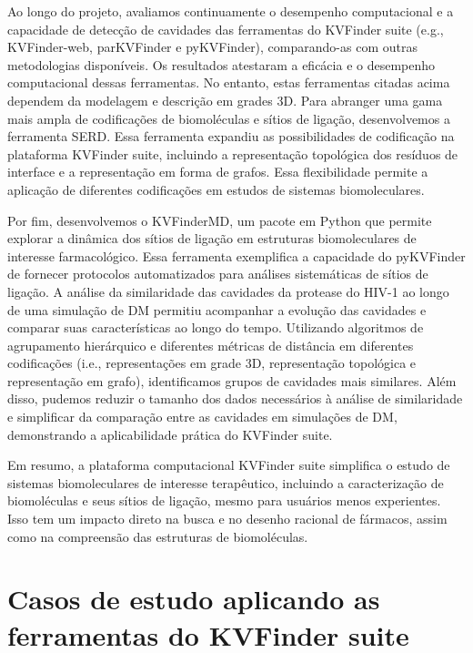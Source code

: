 \documentclass[Portugues]{phdquali}
\def\ie{i.e.\onedot}
\def\eg{e.g.\onedot}
\begin{document}
Ao longo do projeto, avaliamos continuamente o desempenho computacional e a capacidade de detecção de cavidades das ferramentas do KVFinder suite (\eg, KVFinder-web, parKVFinder e pyKVFinder), comparando-as com outras metodologias disponíveis. Os resultados atestaram a eficácia e o desempenho computacional dessas ferramentas. No entanto, estas ferramentas citadas acima dependem da modelagem e descrição em grades 3D. Para abranger uma gama mais ampla de codificações de biomoléculas e sítios de ligação, desenvolvemos a ferramenta SERD. Essa ferramenta expandiu as possibilidades de codificação na plataforma KVFinder suite, incluindo a representação topológica dos resíduos de interface e a representação em forma de grafos. Essa flexibilidade permite a aplicação de diferentes codificações em estudos de sistemas biomoleculares.

Por fim, desenvolvemos o KVFinderMD, um pacote em Python que permite explorar a dinâmica dos sítios de ligação em estruturas biomoleculares de interesse farmacológico. Essa ferramenta exemplifica a capacidade do pyKVFinder de fornecer protocolos automatizados para análises sistemáticas de sítios de ligação. A análise da similaridade das cavidades da protease do HIV-1 ao longo de uma simulação de DM permitiu acompanhar a evolução das cavidades e comparar suas características ao longo do tempo. Utilizando algoritmos de agrupamento hierárquico e diferentes métricas de distância em diferentes codificações (\ie, representações em grade 3D, representação topológica e representação em grafo), identificamos grupos de cavidades mais similares. Além disso, pudemos reduzir o tamanho dos dados necessários à análise de similaridade e simplificar da comparação entre as cavidades em simulações de DM, demonstrando a aplicabilidade prática do KVFinder suite.

Em resumo, a plataforma computacional KVFinder suite simplifica o estudo de sistemas biomoleculares de interesse terapêutico, incluindo a caracterização de biomoléculas e seus sítios de ligação, mesmo para usuários menos experientes. Isso tem um impacto direto na busca e no desenho racional de fármacos, assim como na compreensão das estruturas de biomoléculas.




\appendix

\chapter{Casos de estudo aplicando as ferramentas do KVFinder suite \label{ap:casos-de-estudo}}
\end{document}
